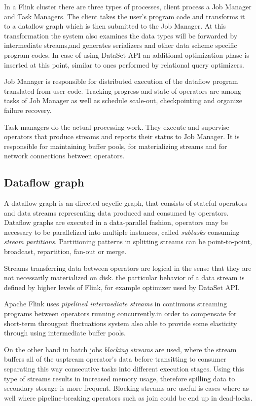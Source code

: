 In a Flink cluster there are three types of processes, client process a Job Manager and Task Managers. The client takes the user's program code and transforms it to a dataflow graph which is then submitted to the Job Manager. At this transformation the system also examines the data types will be forwarded by intermediate streams,and generates serializers and other data scheme specific program codes. In case of using DataSet API an additional optimization phase is inserted at this point, similar to ones performed by relational query optimizers.

Job Manager is responsible for distributed execution of the dataflow program translated from user code. Tracking progress and state of operators are among tasks of Job Manager as well as schedule scale-out, checkpointing and organize failure recovery.

Task managers do the actual processing work. They execute and supervise operators that produce streams and reports their status to Job Manager. It is responsible for maintaining buffer pools, for materializing streams and for network connections between operators.   

\subsection{Dataflow graph}
A dataflow graph is an directed acyclic graph, that consists of stateful operators and data streams representing data produced and consumed by operators.
Dataflow graphs are executed in a data-parallel fashion, operators may be necessary to be parallelized into multiple instances, called \textit{subtasks} consuming \textit{stream partitions}. Partitioning patterns in splitting streams can be point-to-point, broadcast, repartition, fan-out or merge.

Streams transferring data between operators are logical in the sense that they are not necessarily materialized on disk. the particular behavior of a data stream is defined by higher levels of Flink, for example optimizer used by DataSet API.

Apache Flink uses \textit{pipelined intermediate streams} in continuous streaming programs between operators running concurrently.in order to compensate for short-term througput fluctuations system also able to provide some elasticity through using intermediate buffer pools.  

On the other hand in batch jobs \textit{blocking streams} are used, where the stream buffers all of the usptream operator's data before transitting to consumer separating this way consecutive tasks into different execution stages. Using 
 this type of streams results in increased memory usage, therefore spilling data to secondary storage is more frequent. Blocking streams are useful is cases where as well where pipeline-breaking operators such as join\cite{distributedjoin} could be end up in dead-locks.

